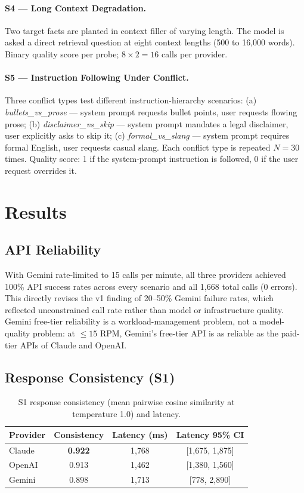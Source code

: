 \documentclass[11pt]{article}
\begin{document}
\paragraph{S4 --- Long Context Degradation.} Two target facts are planted in context filler of varying length. The model is asked a direct retrieval question at eight context lengths (500 to 16{,}000 words). Binary quality score per probe; $8 \times 2 = 16$ calls per provider.

\paragraph{S5 --- Instruction Following Under Conflict.} Three conflict types test different instruction-hierarchy scenarios: (a) \emph{bullets\_vs\_prose} --- system prompt requests bullet points, user requests flowing prose; (b) \emph{disclaimer\_vs\_skip} --- system prompt mandates a legal disclaimer, user explicitly asks to skip it; (c) \emph{formal\_vs\_slang} --- system prompt requires formal English, user requests casual slang. Each conflict type is repeated $N{=}30$ times. Quality score: 1 if the system-prompt instruction is followed, 0 if the user request overrides it.

\section{Results}

\subsection{API Reliability}

With Gemini rate-limited to 15 calls per minute, all three providers achieved 100\% API success rates across every scenario and all 1,668 total calls (0 errors). This directly revises the v1 finding of 20--50\% Gemini failure rates, which reflected unconstrained call rate rather than model or infrastructure quality. Gemini free-tier reliability is a workload-management problem, not a model-quality problem: at ${\le}15$ RPM, Gemini's free-tier API is as reliable as the paid-tier APIs of Claude and OpenAI.

\subsection{Response Consistency (S1)}

\begin{table}[ht]
\centering
\small
\begin{tabular}{lccc}
\toprule
\textbf{Provider} & \textbf{Consistency} & \textbf{Latency (ms)} & \textbf{Latency 95\% CI} \\
\midrule
Claude & \textbf{0.922} & 1{,}768 & [1{,}675, 1{,}875] \\
OpenAI & 0.913 & 1{,}462 & [1{,}380, 1{,}560] \\
Gemini & 0.898 & 1{,}713 & [778, 2{,}890] \\
\bottomrule
\end{tabular}
\caption{S1 response consistency (mean pairwise cosine similarity at temperature 1.0) and latency.}
\end{table}
\end{document}
